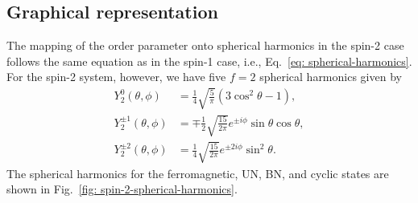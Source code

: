 \subsection{Graphical representation}
The mapping of the order parameter onto spherical harmonics in the spin-2 case
follows the same equation as in the spin-1 case, i.e.,
Eq.~\eqref{eq: spherical-harmonics}.
For the spin-2 system, however, we have five \(f=2\) spherical harmonics given
by
\begin{align}
    Y_2^0(\theta, \phi)       & = \frac{1}{4}\sqrt{\frac{5}{\pi}}
    (3\cos^2\theta - 1),                                                    \\
    Y_2^{\pm 1}(\theta, \phi) & =
    \mp \frac{1}{2}\sqrt{\frac{15}{2\pi}}e^{\pm i\phi}\sin\theta\cos\theta, \\
    Y_2^{\pm 2}(\theta, \phi) & =
    \frac{1}{4}\sqrt{\frac{15}{2\pi}}e^{\pm 2i\phi}\sin^2\theta.
\end{align}
The spherical harmonics for the ferromagnetic, UN, BN, and cyclic states
are shown in Fig.~\ref{fig: spin-2-spherical-harmonics}.
